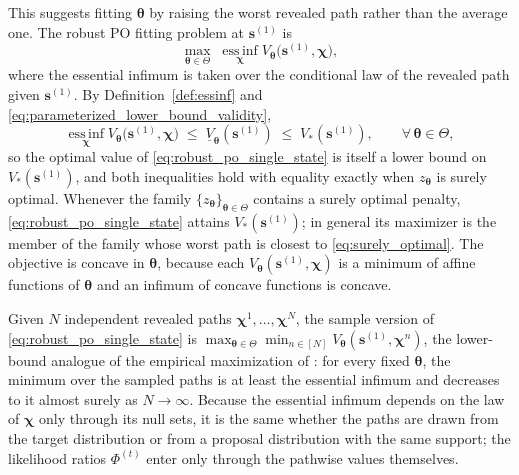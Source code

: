 \documentclass[11pt]{article}
\theoremstyle{definition}
\begin{document}
This suggests fitting \(\boldsymbol{\theta}\) by raising the worst revealed path rather than the average one. The robust PO fitting problem at \(\boldsymbol{s}^{(1)}\) is
\begin{equation}
\label{eq:robust_po_single_state}
\max_{\boldsymbol{\theta}\in\Theta}\;
\operatorname*{ess\,inf}_{\boldsymbol{\chi}}
V_{\boldsymbol{\theta}}\bigl(\boldsymbol{s}^{(1)},\boldsymbol{\chi}\bigr),
\end{equation}
where the essential infimum is taken over the conditional law of the revealed path given \(\boldsymbol{s}^{(1)}\). By Definition~\ref{def:essinf} and \eqref{eq:parameterized_lower_bound_validity},
\begin{equation}
\label{eq:robust_po_single_state_validity}
\operatorname*{ess\,inf}_{\boldsymbol{\chi}}
V_{\boldsymbol{\theta}}\bigl(\boldsymbol{s}^{(1)},\boldsymbol{\chi}\bigr)
\;\le\;\underline V_{\boldsymbol{\theta}}(\boldsymbol{s}^{(1)})\;\le\;V_*(\boldsymbol{s}^{(1)}),
\qquad\forall\,\boldsymbol{\theta}\in\Theta,
\end{equation}
so the optimal value of \eqref{eq:robust_po_single_state} is itself a lower bound on \(V_*(\boldsymbol{s}^{(1)})\), and both inequalities hold with equality exactly when \(z_{\boldsymbol{\theta}}\) is surely optimal. Whenever the family \(\{z_{\boldsymbol{\theta}}\}_{\boldsymbol{\theta}\in\Theta}\) contains a surely optimal penalty, \eqref{eq:robust_po_single_state} attains \(V_*(\boldsymbol{s}^{(1)})\); in general its maximizer is the member of the family whose worst path is closest to \eqref{eq:surely_optimal}. The objective is concave in \(\boldsymbol{\theta}\), because each \(V_{\boldsymbol{\theta}}(\boldsymbol{s}^{(1)},\boldsymbol{\chi})\) is a minimum of affine functions of \(\boldsymbol{\theta}\) and an infimum of concave functions is concave.

Given \(N\) independent revealed paths \(\boldsymbol{\chi}^{1},\dots,\boldsymbol{\chi}^{N}\), the sample version of \eqref{eq:robust_po_single_state} is \(\max_{\boldsymbol{\theta}\in\Theta}\min_{n\in[N]}V_{\boldsymbol{\theta}}(\boldsymbol{s}^{(1)},\boldsymbol{\chi}^{n})\), the lower-bound analogue of the empirical maximization of \citet{belomestny2019}: for every fixed \(\boldsymbol{\theta}\), the minimum over the sampled paths is at least the essential infimum and decreases to it almost surely as \(N\to\infty\). Because the essential infimum depends on the law of \(\boldsymbol{\chi}\) only through its null sets, it is the same whether the paths are drawn from the target distribution or from a proposal distribution with the same support; the likelihood ratios \(\Phi^{(t)}\) enter only through the pathwise values themselves.
\end{document}
